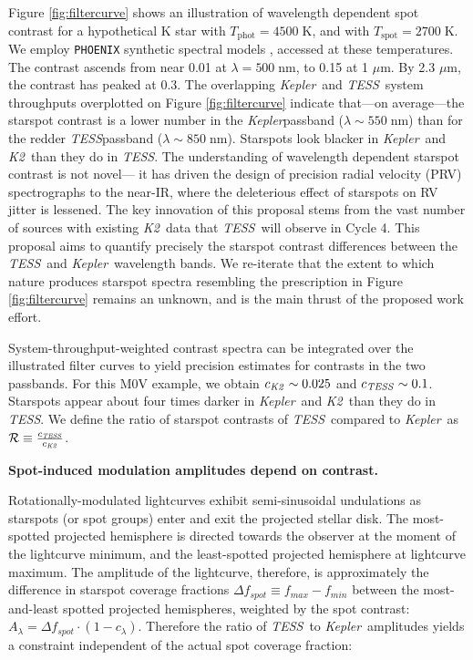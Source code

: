 \documentclass[twocolumn]{aastex631}
\newcommand{\tess}{{\it TESS}}
\newcommand{\kepler}{{\it Kepler}}
\newcommand{\ktwo}{{\it K2}}
\begin{document}
Figure \ref{fig:filtercurve} shows an illustration of wavelength dependent spot contrast for a hypothetical K star with $T_\mathrm{phot}=4500\;$K, and with $T_\mathrm{spot}=2700\;$K.  We employ \texttt{PHOENIX} synthetic spectral models \cite{2013A&A...553A...6H}, accessed at these temperatures.  The contrast ascends from near 0.01 at $\lambda=500\;$nm, to 0.15 at 1 $\mu$m.  By 2.3 $\mu$m, the contrast has peaked at 0.3.  The overlapping \kepler\ and \tess\ system throughputs overplotted on Figure \ref{fig:filtercurve} indicate that---on average---the starspot contrast is a lower number in the \kepler passband ($\lambda \sim 550\;$nm)  than for the redder \tess passband ($\lambda \sim 850\;$nm).  Starspots look blacker in \kepler\ and \ktwo\ than they do in \tess.  The understanding of wavelength dependent starspot contrast is not novel--- it has driven the design of precision radial velocity (PRV) spectrographs to the near-IR, where the deleterious effect of starspots on RV jitter is lessened.  The key innovation of this proposal stems from the vast number of sources with existing \ktwo\ data that \tess\ will observe in Cycle 4.  This proposal aims to quantify precisely the starspot contrast differences between the \tess\ and \kepler\ wavelength bands.  We re-iterate that the extent to which nature produces starspot spectra resembling the prescription in Figure \ref{fig:filtercurve} remains an unknown, and is the main thrust of the proposed work effort.


System-throughput-weighted contrast spectra can be integrated over the illustrated filter curves to yield precision estimates for contrasts in the two passbands. For this M0V example, we obtain $c_{\ktwo}\sim0.025$ and $c_{\tess}\sim0.1$. Starspots appear about four times darker in \kepler\ and \ktwo\ than they do in \tess. We define the ratio of starspot contrasts of \tess\ compared to \kepler\ as $\mathcal{R}\equiv \frac{c_{\tess}}{c_{\ktwo}}$.

\noindent \textbf{Spot-induced modulation amplitudes depend on contrast.}

Rotationally-modulated lightcurves exhibit semi-sinusoidal undulations as starspots (or spot groups) enter and exit the projected stellar disk. The most-spotted projected hemisphere is directed towards the observer at the moment of the lightcurve minimum, and the least-spotted projected hemisphere at lightcurve maximum. The amplitude of the lightcurve, therefore, is approximately the difference in starspot coverage fractions $\Delta f_{spot} \equiv f_{max}-f_{min}$ between the most-and-least spotted projected hemispheres, weighted by the spot contrast: $ A_\lambda = \Delta f_{spot} \cdot (1-c_\lambda)$. Therefore the ratio of \tess\ to \kepler\ amplitudes yields a constraint independent of the actual spot coverage fraction:
\end{document}
